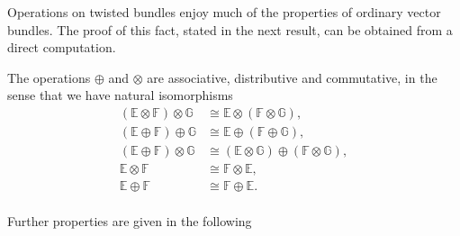 Operations on twisted bundles enjoy much of the properties of ordinary vector bundles. The proof of this fact, stated in the next result, can be obtained from a direct computation.

\begin{proposition}\label{ass_comm}
The operations $\oplus$ and $\otimes$ are associative, distributive and commutative, in the sense that we have natural isomorphisms
$$
\begin{aligned}
(\mathbb{E}\otimes \mathbb{F})\otimes \mathbb{G} &\cong \mathbb{E}\otimes (\mathbb{F}\otimes \mathbb{G}), \\
(\mathbb{E}\oplus \mathbb{F})\oplus \mathbb{G} &\cong \mathbb{E}\oplus (\mathbb{F}\oplus \mathbb{G}), \\
(\mathbb{E}\oplus \mathbb{F})\otimes \mathbb{G} &\cong (\mathbb{E}\otimes \mathbb{G})\oplus (\mathbb{F}\otimes \mathbb{G}),\\
\mathbb{E}\otimes \mathbb{F} &\cong \mathbb{F}\otimes \mathbb{E}, \\
\mathbb{E}\oplus \mathbb{F} &\cong \mathbb{F}\oplus \mathbb{E}. \\
\end{aligned}
$$
\end{proposition}

Further properties are given in the following

